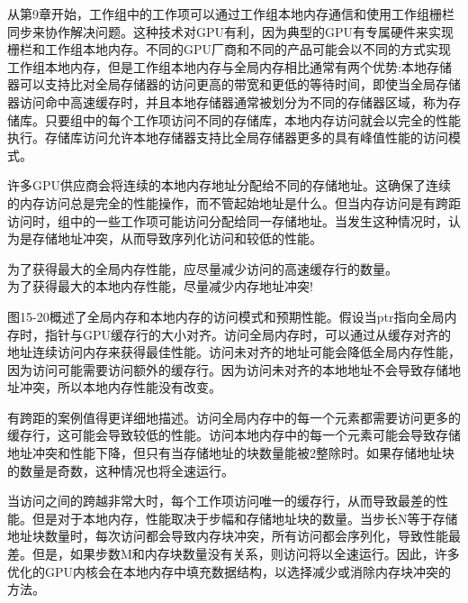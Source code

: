 从第9章开始，工作组中的工作项可以通过工作组本地内存通信和使用工作组栅栏同步来协作解决问题。这种技术对GPU有利，因为典型的GPU有专属硬件来实现栅栏和工作组本地内存。不同的GPU厂商和不同的产品可能会以不同的方式实现工作组本地内存，但是工作组本地内存与全局内存相比通常有两个优势:本地存储器可以支持比对全局存储器的访问更高的带宽和更低的等待时间，即使当全局存储器访问命中高速缓存时，并且本地存储器通常被划分为不同的存储器区域，称为存储库。只要组中的每个工作项访问不同的存储库，本地内存访问就会以完全的性能执行。存储库访问允许本地存储器支持比全局存储器更多的具有峰值性能的访问模式。\par

许多GPU供应商会将连续的本地内存地址分配给不同的存储地址。这确保了连续的内存访问总是完全的性能操作，而不管起始地址是什么。但当内存访问是有跨距访问时，组中的一些工作项可能访问分配给同一存储地址。当发生这种情况时，认为是存储地址冲突，从而导致序列化访问和较低的性能。\par

\begin{tcolorbox}[colback=red!5!white,colframe=red!75!black]
为了获得最大的全局内存性能，应尽量减少访问的高速缓存行的数量。\\

为了获得最大的本地内存性能，尽量减少内存地址冲突!
\end{tcolorbox}

图15-20概述了全局内存和本地内存的访问模式和预期性能。假设当ptr指向全局内存时，指针与GPU缓存行的大小对齐。访问全局内存时，可以通过从缓存对齐的地址连续访问内存来获得最佳性能。访问未对齐的地址可能会降低全局内存性能，因为访问可能需要访问额外的缓存行。因为访问未对齐的本地地址不会导致存储地址冲突，所以本地内存性能没有改变。\par

有跨距的案例值得更详细地描述。访问全局内存中的每一个元素都需要访问更多的缓存行，这可能会导致较低的性能。访问本地内存中的每一个元素可能会导致存储地址冲突和性能下降，但只有当存储地址的块数量能被2整除时。如果存储地址块的数量是奇数，这种情况也将全速运行。\par

当访问之间的跨越非常大时，每个工作项访问唯一的缓存行，从而导致最差的性能。但是对于本地内存，性能取决于步幅和存储地址块的数量。当步长N等于存储地址块数量时，每次访问都会导致内存块冲突，所有访问都会序列化，导致性能最差。但是，如果步数M和内存块数量没有关系，则访问将以全速运行。因此，许多优化的GPU内核会在本地内存中填充数据结构，以选择减少或消除内存块冲突的方法。\par


